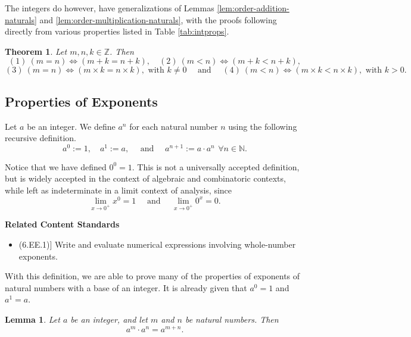 \documentclass[
]{book}
\providecommand{\tightlist}{%
  \setlength{\itemsep}{0pt}\setlength{\parskip}{0pt}}
\newenvironment{standards}{}{}
\newtheorem{theorem}{Theorem}[chapter]
\newtheorem{lemma}{Lemma}[chapter]
\theoremstyle{definition}
\theoremstyle{definition}
\theoremstyle{definition}
\theoremstyle{definition}
\theoremstyle{remark}
\begin{document}
The integers do however, have generalizations of Lemmas \ref{lem:order-addition-naturals} and \ref{lem:order-multiplication-naturals}, with the proofs following directly from various properties listed in Table \ref{tab:intprops}.

\begin{theorem}
Let \(m,n,k\in \mathbb{Z}\). Then \[(1) \: (m=n) \Leftrightarrow (m+k=n+k),  \quad (2) \: (m<n) \Leftrightarrow (m+k<n+k),\]
\[ (3) \: (m=n) \Leftrightarrow (m\times k=n\times k), \mbox{ with } k\neq 0 \quad \mbox{ and } \quad (4) \: (m<n) \Leftrightarrow (m\times k<n\times k), \mbox{ with } k> 0 .\]
\end{theorem}

\hypertarget{properties-of-exponents}{%
\subsection{Properties of Exponents}\label{properties-of-exponents}}

Let \(a\) be an integer. We define \(a^n\) for each natural number \(n\) using the following recursive definition.
\[a^0:=1, \quad a^1 := a, \quad \mbox{ and } \quad a^{n+1}:=a \cdot a^n\, \: \forall n\in \mathbb{N}.\]

Notice that we have defined \(0^0=1\). This is not a universally accepted definition, but is widely accepted in the context of algebraic and combinatoric contexts, while left as indeterminate in a limit context of analysis, since
\[\lim_{x\rightarrow 0^+} x^0 = 1 \quad \mbox{ and } \quad \lim_{x\rightarrow 0^+} 0^x = 0.\]

\begin{standards}

\begin{center}
\textbf{Related Content Standards}

\end{center}

\begin{itemize}
\tightlist
\item
  (6.EE.1){]} Write and evaluate numerical expressions involving whole-number exponents.
\end{itemize}

\end{standards}

With this definition, we are able to prove many of the properties of exponents of natural numbers with a base of an integer. It is already given that \(a^0=1\) and \(a^1=a\).

\begin{lemma}
\protect\hypertarget{lem:exponent-addition}{}\label{lem:exponent-addition}Let \(a\) be an integer, and let \(m\) and \(n\) be natural numbers. Then
\[a^m\cdot a^n=a^{m+n}.\]
\end{lemma}
\end{document}
